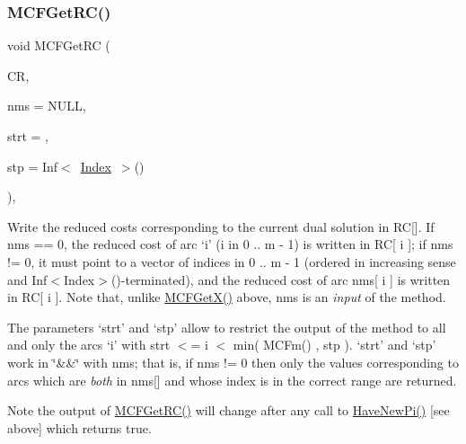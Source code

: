 \subsubsection{\texorpdfstring{M\+C\+F\+Get\+R\+C()}{MCFGetRC()}\hspace{0.1cm}{\footnotesize\ttfamily [4/5]}}
{\footnotesize\ttfamily void M\+C\+F\+Get\+RC (\begin{DoxyParamCaption}\item[{\mbox{\hyperlink{class_m_c_f_class_a62409402be4e4b301e1a568f99f877be}{C\+Row}}}]{CR,  }\item[{\mbox{\hyperlink{class_m_c_f_class_a81575b2d4e4d5636b17170432150ae69}{c\+Index\+\_\+\+Set}}}]{nms = {\ttfamily NULL},  }\item[{\mbox{\hyperlink{class_m_c_f_class_a76aaabb20535c51a2752b93f6c38fe54}{c\+Index}}}]{strt = {},  }\item[{\mbox{\hyperlink{class_m_c_f_class_ad53d6229d7ec28555a9c9c2fd9abf773}{Index}}}]{stp = {\ttfamily Inf$<$~\mbox{\hyperlink{class_m_c_f_class_ad53d6229d7ec28555a9c9c2fd9abf773}{Index}}~$>$()} }\end{DoxyParamCaption})\hspace{0.3cm}{\ttfamily [override]}, {\ttfamily [virtual]}}

Write the reduced costs corresponding to the current dual solution in RC\mbox{[}\mbox{]}. If nms == 0, the reduced cost of arc `i' (i in 0 .. m -\/ 1) is written in RC\mbox{[} i \mbox{]}; if nms != 0, it must point to a vector of indices in 0 .. m -\/ 1 (ordered in increasing sense and Inf$<$\+Index$>$()-\/terminated), and the reduced cost of arc nms\mbox{[} i \mbox{]} is written in RC\mbox{[} i \mbox{]}. Note that, unlike \mbox{\hyperlink{class_m_c_f_class_a4eb307e0707adaef99bb0e08c9e10eb8}{M\+C\+F\+Get\+X()}} above, nms is an {\itshape input} of the method.

The parameters `strt' and `stp' allow to restrict the output of the method to all and only the arcs `i' with strt $<$= i $<$ min( M\+C\+Fm() , stp ). `strt' and `stp' work in \char`\"{}\&\&\char`\"{} with nms; that is, if nms != 0 then only the values corresponding to arcs which are {\itshape both} in nms\mbox{[}\mbox{]} and whose index is in the correct range are returned.

\begin{DoxyNote}{Note}
the output of \mbox{\hyperlink{class_m_c_f_class_af027cee8179a876a4879c73820c380d1}{M\+C\+F\+Get\+R\+C()}} will change after any call to \mbox{\hyperlink{class_m_c_f_class_a87b2b6516a7874ac55145312bd2d55bb}{Have\+New\+Pi()}} \mbox{[}see above\mbox{]} which returns true. 
\end{DoxyNote}


